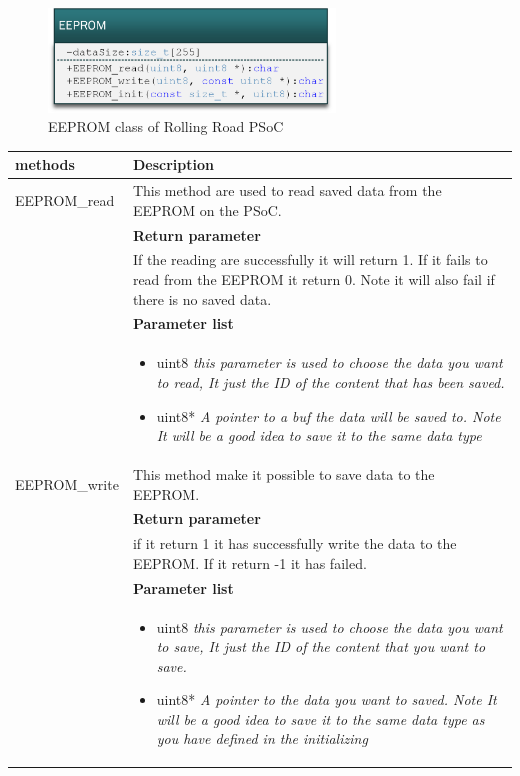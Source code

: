 \begin{figure}[H]
	\centering
	\includegraphics [width=3in]{Software/Pictures/klassediagram_EEPROM.png}
	\caption{EEPROM class of Rolling Road PSoC}
	\label{fig:Class_diagram_EEPROM_RR_PSoC}
\end{figure}


\begin{table}[H]
	\centering
	\begin{tabular}{|p{5 cm}|p{10 cm}|}
		\hline
		\textbf{methods} & \textbf{Description} \\ \hline
		
		EEPROM\_read
		& This method are used to read saved data from the EEPROM on the PSoC.
		\\ & \textbf{Return parameter}
		\\ & If the reading are successfully it will return 1. If it fails to read from the EEPROM it return 0. Note it will also fail if there is no saved data.
		\\ & \textbf{Parameter list}
		\\ & \begin{itemize}
			\item {\large uint8}
			\subitem \textit{this parameter is used to choose the data you want to read, It just the ID of the content that has been saved.}
			\item {\large uint8*}
			\subitem \textit{A pointer to a buf the data will be saved to. Note It will be a good idea to save it to the same data type}
		\end{itemize}
		\\ \hline
		
		EEPROM\_write
		& This method make it possible to save data to the EEPROM.
		\\ & \textbf{Return parameter}
		\\ & if it return 1 it has successfully write the data to the EEPROM. If it return -1 it has failed.
		\\ & \textbf{Parameter list}
		\\ & \begin{itemize}
			\item {\large uint8}
			\subitem \textit{this parameter is used to choose the data you want to save, It just the ID of the content that you want to save.}
			\item {\large uint8*}
			\subitem \textit{A pointer to the data you want to saved. Note It will be a good idea to save it to the same data type as you have defined in the initializing}
		\end{itemize}
		\\ \hline
		

\end{tabular}
\end{table}

